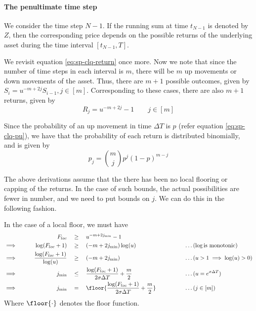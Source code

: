 \paragraph{The penultimate time step}

We consider the time step $ N - 1 $. If the running sum at time $ t_{N - 1} $ is denoted by $ Z $, then the corresponding price depends on the possible returns of the underlying asset during the time interval $ [ t_{N - 1}, T ] $.

We revisit equation \ref{eq:sp-clq-return} once more. Now we note that since the number of time steps in each interval is $m$, there will be $m$ up movements or down movements of the asset. Thus, there are $ m + 1 $ possible outcomes, given by $ S_i = u^{-m + 2j} S_{i-1}, j \in [m] $. Corresponding to these cases, there are also $ m + 1 $ returns, given by
\begin{equation}
	\label{eq:sp-clq-return-final}
	R_j = u^{-m + 2j} - 1 \qquad j \in [m]
\end{equation}

Since the probability of an up movement in time $ \Delta T $ is $p$ (refer equation \ref{eq:sp-clq-pu}), we have that the probability of each return is distributed binomially, and is given by
\begin{equation}
	\label{eq:sp-clq-prb-binom}
	p_j = \binom{m}{j} p^j (1-p)^{m-j}
\end{equation}

The above derivations assume that the there has been no local flooring or capping of the returns. In the case of such bounds, the actual possibilities are fewer in number, and we need to put bounds on $j$. We can do this in the following fashion.

In the case of a local floor, we must have
\begin{alignat*}{9}
	                 &&  F_{loc}  \quad & \ge \quad  u^{ -m + 2 j_{\min} } - 1 && \\
	\implies  \qquad &&  \log(F_{loc} + 1)  \quad & \ge \quad  ( -m + 2 j_{\min} ) \log(u)  &&  \qquad \qquad \dots (\log \text{is monotonic}) \\
	\implies  \qquad &&  \frac{\log(F_{loc} + 1)}{\log(u)}  \quad & \ge \quad  ( -m + 2 j_{\min} )  &&  \qquad \qquad \dots (u > 1 \implies \log(u) > 0) \\
	\implies  \qquad &&  j_{\min}  \quad & \le \quad  \frac{ \log(F_{loc} + 1) }{ 2 \sigma \Delta T } + \frac{m}{2}  &&  \qquad \qquad \dots (u = e^{ \sigma \Delta T }) \\
	\implies  \qquad &&  j_{\min}  \quad & = \quad  \floor{ \frac{ \log(F_{loc} + 1) }{ 2 \sigma \Delta T } + \frac{m}{2} }  &&  \qquad \qquad \dots (j \in [m]) \\
\end{alignat*}
Where $ \floor{\cdot} $ denotes the floor function.

